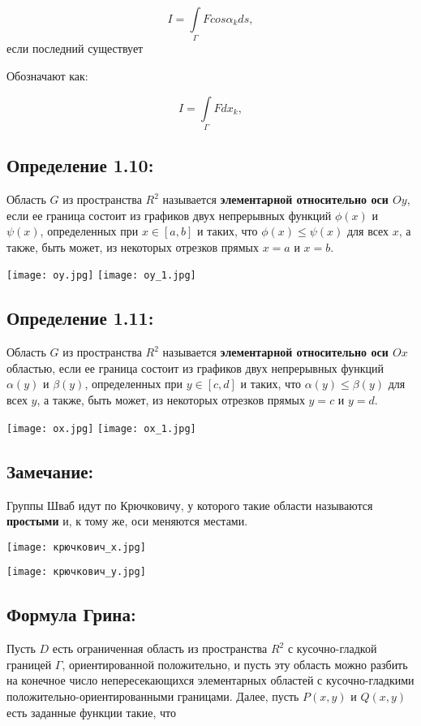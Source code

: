 \documentclass[12pt, english]{article}
\begin{document}
	$$I = \int\limits_{\Gamma}{} F  cos \alpha_k d{s},$$
	если последний существует
	
	Обозначают как:
	
		$$I = \int\limits_{\Gamma}{} F d{x_k},$$
	\newpage
\subsection*{Определение 1.10:}
	Область $G$ из пространства $R^2$ называется \textbf{элементарной относительно оси $Oy$}, если ее граница состоит из графиков двух непрерывных функций $\phi(x)$ и $\psi(x)$, определенных при
$x \in [a, b]$ и таких, что $\phi(x)	\leq \psi(x)$ для всех $x$, а также, быть
может, из некоторых отрезков прямых $x = a$ и $x = b$.


\texttt{[image: oy.jpg]}
\texttt{[image: oy\_1.jpg]}

\subsection*{Определение 1.11:}
	Область $G$ из пространства $R^2$ называется \textbf{элементарной относительно оси $Ox$} областью, если ее граница состоит из графиков двух непрерывных функций $\alpha(y)$ и $\beta(y)$, определенных при
$y \in [c, d]$ и таких, что $\alpha(y)	\leq \beta(y)$ для всех $y$, а также, быть
может, из некоторых отрезков прямых $y = c$ и $y = d$.


\texttt{[image: ox.jpg]}
\texttt{[image: ox\_1.jpg]}
\newpage
\subsection*{Замечание:}
	Группы Шваб идут по Крючковичу, у которого такие области называются \textbf{простыми} и, к тому же, оси меняются местами.
	
	
\texttt{[image: крючкович\_x.jpg]}

\texttt{[image: крючкович\_y.jpg]}
\newpage
\subsection{Формула Грина:}
	Пусть $D$ есть ограниченная область из пространства $R^2$
с кусочно-гладкой границей $\Gamma$, ориентированной положительно, и пусть
эту область можно разбить на конечное число непересекающихся элементарных областей с кусочно-гладкими положительно-ориентированными границами. Далее, пусть $P(x, y)$ и $Q(x, y)$ есть заданные функции
такие, что 
\end{document}
